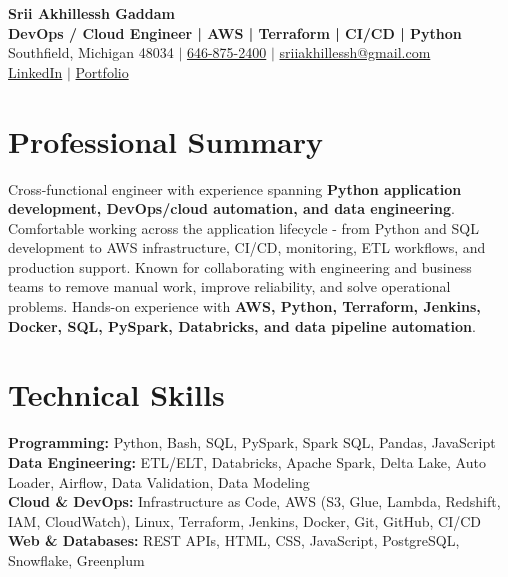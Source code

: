 \documentclass[letterpaper,10pt]{article}
\begin{document}
\fontsize{9.35pt}{10.45pt}\selectfont

\begin{center}
    {\LARGE \textbf{Srii Akhillessh Gaddam}} \\[-1pt]
    \textbf{DevOps / Cloud Engineer | AWS | Terraform | CI/CD | Python} \\[2pt]
    Southfield, Michigan 48034 $|$
    \href{tel:6468752400}{646-875-2400} $|$
    \href{mailto:sriiakhillessh@gmail.com}{sriiakhillessh@gmail.com} \\[1pt]
    \href{https://www.linkedin.com/in/srii-akhiilessh-gaddam-b48668191/}{LinkedIn} $|$
    \href{https://sriiakhillesshg.github.io/portfolio/}{Portfolio}
\end{center}
\vspace{-8pt}

\section{Professional Summary}
\small{Cross-functional engineer with experience spanning \textbf{Python application development, DevOps/cloud automation, and data engineering}. Comfortable working across the application lifecycle - from Python and SQL development to AWS infrastructure, CI/CD, monitoring, ETL workflows, and production support. Known for collaborating with engineering and business teams to remove manual work, improve reliability, and solve operational problems. Hands-on experience with \textbf{AWS, Python, Terraform, Jenkins, Docker, SQL, PySpark, Databricks, and data pipeline automation}.}

\section{Technical Skills}
\small{
\textbf{Programming:} Python, Bash, SQL, PySpark, Spark SQL, Pandas, JavaScript \\
\textbf{Data Engineering:} ETL/ELT, Databricks, Apache Spark, Delta Lake, Auto Loader, Airflow, Data Validation, Data Modeling \\
\textbf{Cloud \& DevOps:} Infrastructure as Code, AWS (S3, Glue, Lambda, Redshift, IAM, CloudWatch), Linux, Terraform, Jenkins, Docker, Git, GitHub, CI/CD \\
\textbf{Web \& Databases:} REST APIs, HTML, CSS, JavaScript, PostgreSQL, Snowflake, Greenplum
}
\end{document}
